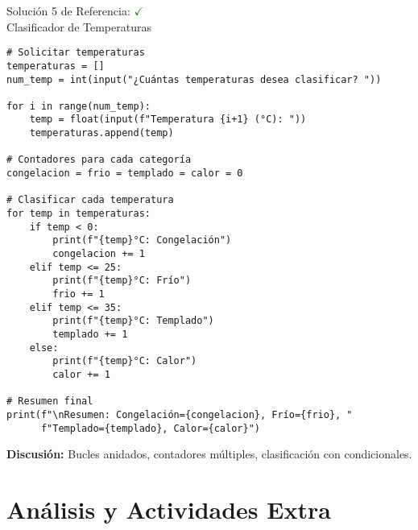 \documentclass[10pt]{beamer}
\begin{document}
\begin{frame}[fragile]{Solución 5 de Referencia: \hfill \textcolor{green}{$\checkmark$} \\ Clasificador de Temperaturas}
\begin{verbatim}
# Solicitar temperaturas
temperaturas = []
num_temp = int(input("¿Cuántas temperaturas desea clasificar? "))

for i in range(num_temp):
    temp = float(input(f"Temperatura {i+1} (°C): "))
    temperaturas.append(temp)

# Contadores para cada categoría
congelacion = frio = templado = calor = 0

# Clasificar cada temperatura
for temp in temperaturas:
    if temp < 0:
        print(f"{temp}°C: Congelación")
        congelacion += 1
    elif temp <= 25:
        print(f"{temp}°C: Frío")
        frio += 1
    elif temp <= 35:
        print(f"{temp}°C: Templado")
        templado += 1
    else:
        print(f"{temp}°C: Calor")
        calor += 1

# Resumen final
print(f"\nResumen: Congelación={congelacion}, Frío={frio}, "
      f"Templado={templado}, Calor={calor}")
\end{verbatim}
\textbf{Discusión:} Bucles anidados, contadores múltiples, clasificación con condicionales.
\end{frame}

\section{Análisis y Actividades Extra}
\end{document}
